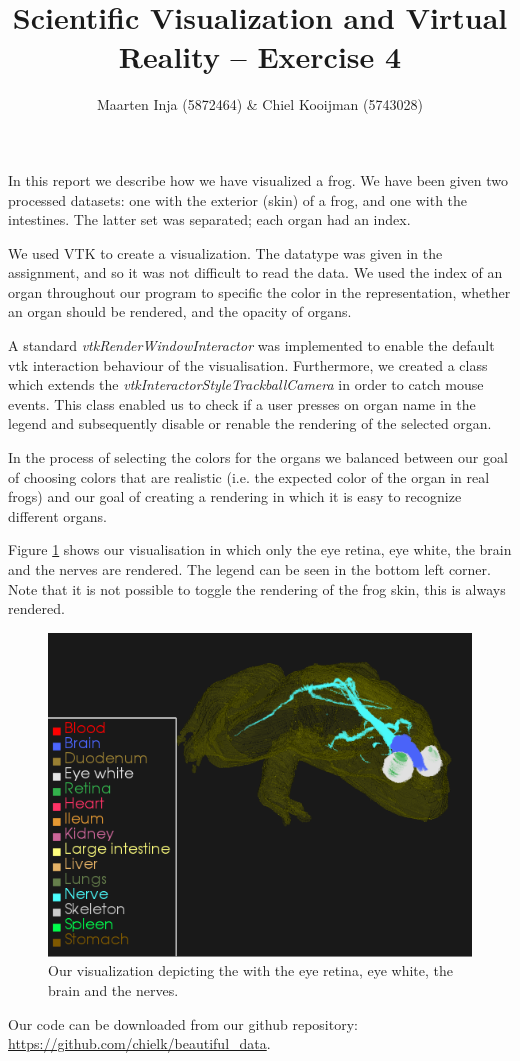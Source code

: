 \documentclass{article}[10pt]
\title{Scientific Visualization and Virtual Reality – Exercise 4}
\author{Maarten Inja (5872464) \& Chiel Kooijman (5743028)}
\begin{document}
\maketitle

In this report we describe how we have visualized a frog. We have been given two
processed datasets: one with the exterior (skin) of a frog, and one with the
intestines. The latter set was separated; each organ had an index.

We used VTK to create a visualization. The datatype was given in the
assignment, and so it was not difficult to read the data. We used the index of an
organ throughout our program to specific the color in the representation,
whether an organ should be rendered, and the opacity of organs.

A standard \emph{vtkRenderWindowInteractor} was implemented to enable the default
vtk interaction behaviour of the visualisation. Furthermore, we created a class
which extends the \emph{vtkInteractorStyleTrackballCamera} in order to catch
mouse events. This class enabled us to check if a user presses on organ name in
the legend and subsequently disable or renable the rendering of the selected
organ.

In the process of selecting the colors for the organs we balanced between our
goal of choosing colors that are realistic (i.e. the expected color of the organ
in real frogs) and our goal of creating a rendering in which it is easy to
recognize different organs.

Figure \ref{fig:frog_brain} shows our visualisation in which only the eye retina,
eye white, the brain and the nerves are rendered. The legend can be seen in the
bottom left corner. Note that it is not possible to toggle the rendering of the
frog skin, this is always rendered.

\begin{figure}[h]
    \includegraphics[width=\textwidth]{frog_brain}
    \caption{Our visualization depicting the with the eye retina, eye white, the brain and the nerves.}
    \label{fig:frog_brain}
\end{figure}

Our code can be downloaded from our github repository:
\url{https://github.com/chielk/beautiful\_data}.
\end{document}
